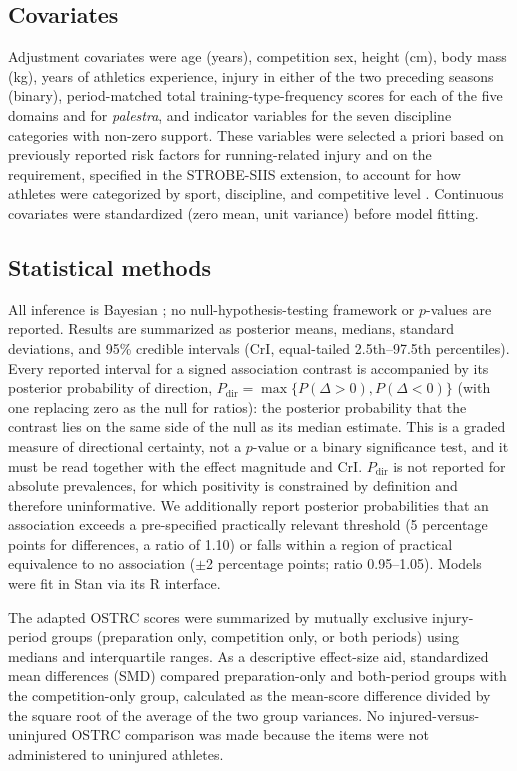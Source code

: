 \subsection{Covariates}
\label{sec:covariates}
Adjustment covariates were age (years), competition sex, height (cm), body mass (kg), years of athletics experience, injury in either of the two preceding seasons (binary), period-matched total training-type-frequency scores for each of the five domains and for \emph{palestra}, and indicator variables for the seven discipline categories with non-zero support. These variables were selected a priori based on previously reported risk factors for running-related injury \citep{taunton2003running} and on the requirement, specified in the STROBE-SIIS extension, to account for how athletes were categorized by sport, discipline, and competitive level \citep{bahr2020strobesiis}. Continuous covariates were standardized (zero mean, unit variance) before model fitting.

\subsection{Statistical methods}
\label{sec:statistics}
All inference is Bayesian \citep{gelman2013bda}; no null-hypothesis-testing framework or $p$-values are reported. Results are summarized as posterior means, medians, standard deviations, and 95\% credible intervals (CrI, equal-tailed 2.5th--97.5th percentiles). Every reported interval for a signed association contrast is accompanied by its posterior probability of direction, $P_{\mathrm{dir}}=\max\{P(\Delta>0),P(\Delta<0)\}$ (with one replacing zero as the null for ratios): the posterior probability that the contrast lies on the same side of the null as its median estimate. This is a graded measure of directional certainty, not a $p$-value or a binary significance test, and it must be read together with the effect magnitude and CrI. $P_{\mathrm{dir}}$ is not reported for absolute prevalences, for which positivity is constrained by definition and therefore uninformative. We additionally report posterior probabilities that an association exceeds a pre-specified practically relevant threshold (5 percentage points for differences, a ratio of 1.10) or falls within a region of practical equivalence to no association ($\pm$2 percentage points; ratio 0.95--1.05). Models were fit in Stan \citep{carpenter2017stan} via its R interface.

The adapted OSTRC scores were summarized by mutually exclusive injury-period groups (preparation only, competition only, or both periods) using medians and interquartile ranges. As a descriptive effect-size aid, standardized mean differences (SMD) compared preparation-only and both-period groups with the competition-only group, calculated as the mean-score difference divided by the square root of the average of the two group variances. No injured-versus-uninjured OSTRC comparison was made because the items were not administered to uninjured athletes.

